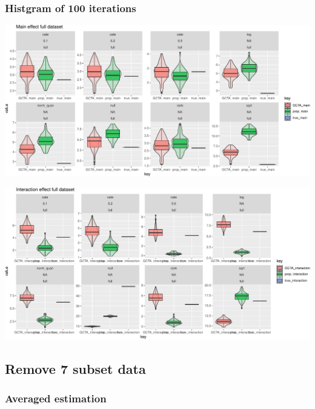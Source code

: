 \documentclass[]{article}
\begin{document}

\clearpage

\subsubsection{Histgram of 100
iterations}\label{histgram-of-100-iterations}

\includegraphics{Fixed_effect_simulation_files/figure-latex/full_main-1.pdf}

\includegraphics{Fixed_effect_simulation_files/figure-latex/full_inter-1.pdf}

\subsection{Remove 7 subset data}\label{remove-7-subset-data}

\subsubsection{Averaged estimation}\label{averaged-estimation-1}

\end{document}
